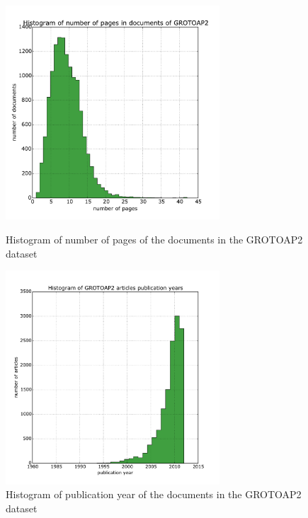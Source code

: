 \begin{figure}
  \centering
\begin{minipage}[t!]{0.45\linewidth}
  \includegraphics[width=8cm]{plots/pages_histogram}
  \caption{Histogram of number of pages of the documents in the GROTOAP2 dataset}
  \label{fig:page_count_histogram}
\end{minipage}
\quad
\begin{minipage}[t!]{0.45\linewidth}
  \includegraphics[width=8cm]{plots/publication_year_histogram}
  \caption{Histogram of publication year of the documents in the GROTOAP2 dataset}
  \label{fig:publication_year_histogram}
\end{minipage}
\end{figure}
